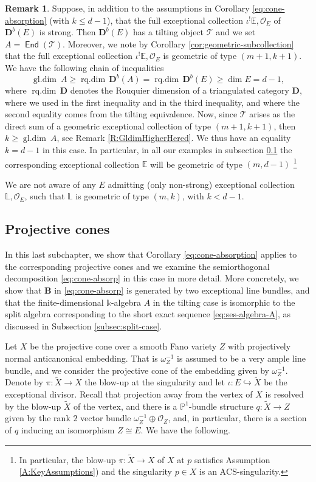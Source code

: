 \documentclass[a4paper,11pt, reqno]{amsart}
\def\E{\mathbb E}
\def\L{\mathbb L}
\def\P{\mathbb P}
\def\BB{\mathbf B}
\def\DD{\mathbf D}
\def\OO{\mathcal O}
\def\sT{\mathscr{T}}
\def\gldim{{\operatorname{gl.dim}\ }}
\def\rqdim{{\operatorname{rq.dim}}}
\newcommand{\opname}[1]{\operatorname{\mathsf{#1}}}
\newcommand{\End}{\opname{End}}
\def\Db{\DD^b}
\theoremstyle{plain}
\theoremstyle{definition}
\newtheorem{remark}[dummy]{Remark}
\numberwithin{equation}{section}
\newlength{\arrow}
\begin{document}
\begin{remark}\label{rmk:k-geq-d-1}
   Suppose, in addition to the assumptions in Corollary \ref{eq:cone-absorption} (with $k \leq d-1$), that the full exceptional collection $\iota^! \E , \OO_E $ of $\Db(E)$ is strong.
   Then $\Db(E) $ has a tilting object $\sT$ and we set $A = \End ( \sT )$. 
   Moreover, we note by Corollary \ref{cor:geometric-subcollection} that the full exceptional collection $\iota^! \E ,  \OO_E$ is geometric of type $( m+1 , k+1 )$.
   We have the following chain of inequalities 
   \[
    \gldim A \geq \rqdim \, \Db(A) = \rqdim \, \Db(E) \geq \dim E = d-1 ,
   \]
   where $\rqdim \, \DD$ denotes the Rouquier dimension of a triangulated category $\DD$, where we used \cite{krause-kussin} in the first inequality and \cite[Proposition 7.17]{rouquier} in the third inequality, and where the second equality comes from the tilting equivalence.
   Now, since $\sT$  arises as the direct sum of a
geometric exceptional collection of type $(m+1, k+1)$,
then $k \geq  \gldim A$, see Remark \ref{R:GldimHigherHered}.
We thus have an equality $k = d-1$ in this case.
In particular, in all our examples in subsection \ref{subsec:ProjCones} the corresponding exceptional collection $\E$ will be geometric of type $(m , d-1)$ \footnote{In particular, the blow-up $\pi \colon \tilde{X} \to X$ of $X$ at $p$ satisfies Assumption \ref{A:KeyAssumptions}) 
and the singularity $p \in X$ is an $\mathrm{ACS}$-singularity. }


We are not aware of any $E$ admitting  (only non-strong) exceptional collection $\L , \OO_E$, such that $\L$ is geometric of type $(m,k)$, with $k < d-1$.
\end{remark}

\subsection{Projective cones}\label{subsec:ProjCones}
In this last subchapter, we show that Corollary \ref{eq:cone-absorption} applies to the corresponding projective cones and we examine the semiorthogonal decomposition \eqref{eq:cone-absorp} in this case in more detail.
More concretely, we show that $\BB$ in \eqref{eq:cone-absorp} is generated by two exceptional line bundles, and that the finite-dimensional $\mathbb{k}$-algebra $A$ in the tilting case is isomorphic to the split algebra corresponding to the short exact sequence \eqref{eq:ses-algebra-A}, as discussed in Subsection \ref{subsec:split-case}.

Let $X$ be the projective cone over a smooth Fano variety $Z$ with projectively normal anticanonical embedding. 
That is $\omega_Z^{-1}$ is assumed to be a very ample line bundle, and we consider the projective cone of the embedding given by $\omega_Z^{-1}$.
Denote by $\pi \colon \tilde{X} \to X$ the blow-up at the singularity and let $\iota\colon E\hookrightarrow \tilde{X}$ be the exceptional divisor.
Recall that projection away from the vertex of $X$ is resolved by the blow-up $\tilde{X}$ of the vertex, and there is a $\P^1$-bundle structure $q \colon \tilde{X} \to Z$ 
given by the rank $2$ vector bundle $\omega_Z^{-1} \oplus \OO_Z$,
and, in particular, there is a section of $q$ inducing an isomorphism $Z \cong E$.
We have the following.
\end{document}
